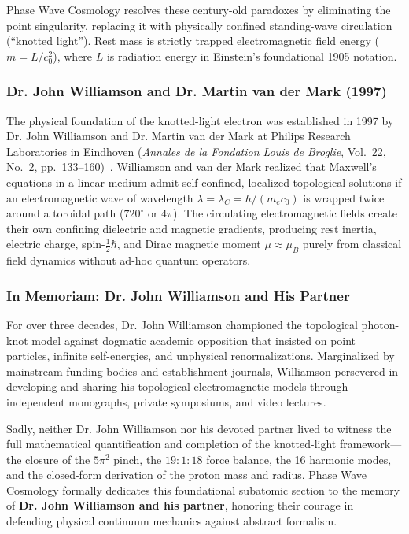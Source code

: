 \documentclass[11pt,a4paper]{article}
\begin{document}
Phase Wave Cosmology resolves these century-old paradoxes by eliminating the point singularity, replacing it with physically confined standing-wave circulation (``knotted light''). Rest mass is strictly trapped electromagnetic field energy ($m = L/c_0^2$), where $L$ is radiation energy in Einstein's foundational 1905 notation.

\subsubsection{Dr. John Williamson and Dr. Martin van der Mark (1997)}
\label{subsubsec:williamson_vdmark}

The physical foundation of the knotted-light electron was established in 1997 by Dr. John Williamson and Dr. Martin van der Mark at Philips Research Laboratories in Eindhoven (\textit{Annales de la Fondation Louis de Broglie}, Vol.~22, No.~2, pp.~133--160)~\cite{Williamson1997}. Williamson and van der Mark realized that Maxwell's equations in a linear medium admit self-confined, localized topological solutions if an electromagnetic wave of wavelength $\lambda = \lambda_C = h / (m_e c_0)$ is wrapped twice around a toroidal path ($720^\circ$ or $4\pi$). The circulating electromagnetic fields create their own confining dielectric and magnetic gradients, producing rest inertia, electric charge, spin-$\frac{1}{2}\hbar$, and Dirac magnetic moment $\mu \approx \mu_B$ purely from classical field dynamics without ad-hoc quantum operators.

\subsubsection{In Memoriam: Dr. John Williamson and His Partner}
\label{subsubsec:in_memoriam}

For over three decades, Dr. John Williamson championed the topological photon-knot model against dogmatic academic opposition that insisted on point particles, infinite self-energies, and unphysical renormalizations. Marginalized by mainstream funding bodies and establishment journals, Williamson persevered in developing and sharing his topological electromagnetic models through independent monographs, private symposiums, and video lectures.

Sadly, neither Dr. John Williamson nor his devoted partner lived to witness the full mathematical quantification and completion of the knotted-light framework---the closure of the $5\pi^2$ pinch, the $19:1:18$ force balance, the 16 harmonic modes, and the closed-form derivation of the proton mass and radius. Phase Wave Cosmology formally dedicates this foundational subatomic section to the memory of \textbf{Dr. John Williamson and his partner}, honoring their courage in defending physical continuum mechanics against abstract formalism.
\end{document}
